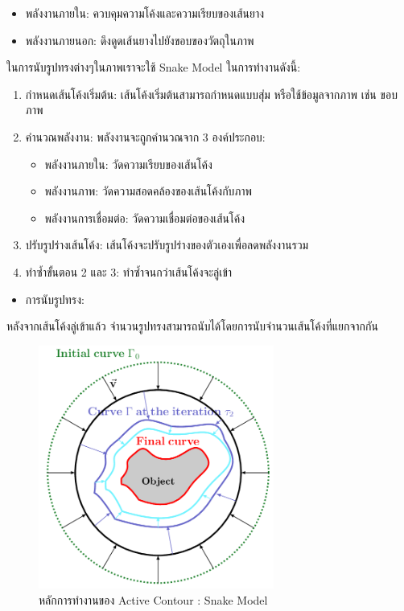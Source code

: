 \begin{itemize}
  \item {พลังงานภายใน: ควบคุมความโค้งและความเรียบของเส้นยาง}
  \item {พลังงานภายนอก: ดึงดูดเส้นยางไปยังขอบของวัตถุในภาพ}
\end{itemize}

ในการนับรูปทรงต่างๆในภาพเราจะใช้  Snake Model ในการทำงานดังนี้:

\begin{enumerate}
  \item {กำหนดเส้นโค้งเริ่มต้น: เส้นโค้งเริ่มต้นสามารถกำหนดแบบสุ่ม หรือใช้ข้อมูลจากภาพ เช่น ขอบภาพ}
  \item {คำนวณพลังงาน: พลังงานจะถูกคำนวณจาก 3 องค์ประกอบ:}
  \begin{itemize}
  \item {พลังงานภายใน: วัดความเรียบของเส้นโค้ง}
  \item {พลังงานภาพ: วัดความสอดคล้องของเส้นโค้งกับภาพ}
  \item {พลังงานการเชื่อมต่อ: วัดความเชื่อมต่อของเส้นโค้ง}
  \end{itemize}
  \item {ปรับรูปร่างเส้นโค้ง: เส้นโค้งจะปรับรูปร่างของตัวเองเพื่อลดพลังงานรวม}
  \item {ทำซ้ำขั้นตอน 2 และ 3: ทำซ้ำจนกว่าเส้นโค้งจะลู่เข้า}
\end{enumerate}

\begin{itemize}
  \item {การนับรูปทรง:}
\end{itemize}

หลังจากเส้นโค้งลู่เข้าแล้ว จำนวนรูปทรงสามารถนับได้โดยการนับจำนวนเส้นโค้งที่แยกจากกัน

\begin{figure}
  \begin{center}
    \includegraphics[height=8cm]{2_6.png}
  \end{center}
  \caption[Poem]{หลักการทำงานของ Active Contour : Snake Model}
\end{figure}

